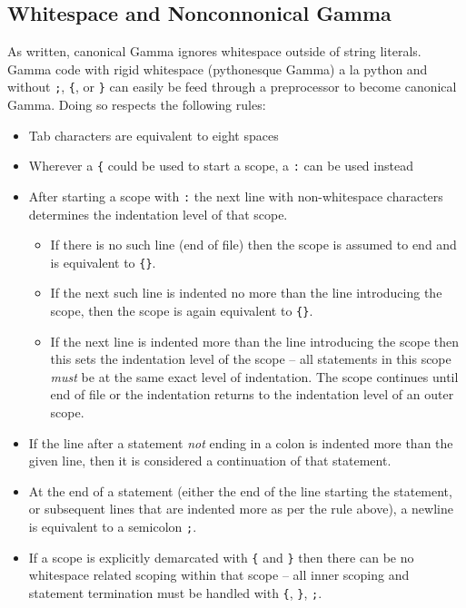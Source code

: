 \subsection{Whitespace and Nonconnonical Gamma}
As written, canonical Gamma ignores whitespace outside of string literals. Gamma code with rigid whitespace (pythonesque Gamma) a la python and without \verb!;!, \verb!{!, or \verb!}! can easily be feed through a preprocessor to become canonical Gamma. Doing so respects the following rules:
\begin{itemize}
\item Tab characters are equivalent to eight spaces
\item Wherever a \verb!{! could be used to start a scope, a \verb!:! can be used instead
\item After starting a scope with \verb!:! the next line with non-whitespace characters determines the indentation level of that scope.
\begin{itemize}
\item If there is no such line (end of file) then the scope is assumed to end and is equivalent to \verb!{}!.
\item If the next such line is indented no more than the line introducing the scope, then the scope is again equivalent to \verb!{}!.
\item If the next line is indented more than the line introducing the scope then this sets the indentation level of the scope -- all statements in this scope \emph{must} be at the same exact level of indentation. The scope continues until end of file or the indentation returns to the indentation level of an outer scope.
\end{itemize}
\item If the line after a statement \emph{not} ending in a colon is indented more than the given line, then it is considered a continuation of that statement.
\item At the end of a statement (either the end of the line starting the statement, or subsequent lines that are indented more as per the rule above), a newline is equivalent to a semicolon \verb!;!.
\item If a scope is explicitly demarcated with \verb!{! and \verb!}! then there can be no whitespace related scoping within that scope -- all inner scoping and statement termination must be handled with \verb!{!, \verb!}!, \verb!;!. 
\end{itemize}

